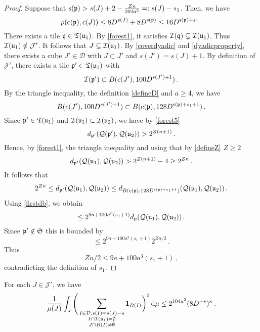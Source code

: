 {    \begin{proof}
        Suppose that $\mathrm{s}(\mathfrak p) > s(J) + 2 -\frac{Zn}{202a^3} =: s(J) - s_1$. Then, we have
        $$
            \rho(\mathrm{c}(\mathfrak p), c(J)) \le 8D^{s(J)}+8D^{\mathrm{s}(\mathfrak p)} \le 16 D^{\mathrm{s}(\mathfrak p) + s_1}\,.
        $$
        There exists a tile $\mathfrak q \in \mathfrak T(\mathfrak u_1)$. By \eqref{forest1}, it satisfies $\mathcal{I}(\mathfrak q) \subsetneq \mathcal{I}(\mathfrak u_1)$. Thus $\mathcal{I}(\mathfrak u_1) \notin \mathcal{J}'$. It follows that $J \subsetneq \mathcal{I}(\mathfrak u_1)$. By \eqref{coverdyadic} and \eqref{dyadicproperty}, there exists a cube $J' \in \mathcal{D}$ with $J \subset J'$ and $s(J') = s(J) + 1$. By definition of $\mathcal{J}'$, there exists a tile $\mathfrak p' \in \mathfrak T(\mathfrak u_1)$ with
        $$
            \mathcal{I}(\mathfrak p') \subset B(c(J'), 100 D^{s(J') + 1})\,.
        $$
        By the triangle inequality, the definition \eqref{defineD} and $a \ge 4$, we have
        $$
            B(c(J'), 100 D^{s(J')+1}) \subset B(\mathrm{c}(\mathfrak p), 128 D^{\mathrm{s}(\mathfrak p) + s_1 + 1})\,.
        $$
        Since $\mathfrak p' \in \mathfrak T(\mathfrak u_1)$ and $\mathcal{I}(\mathfrak u_1) \subset \mathcal{I}(\mathfrak u_2)$, we have by \eqref{forest5}
        $$
            d_{\mathfrak p'}(\mathcal{Q}(\mathfrak p'), \mathcal{Q}(\mathfrak u_2)) > 2^{Z(n+1)}\,.
        $$
        Hence, by \eqref{forest1}, the triangle inequality and using that by \eqref{defineZ} $Z \ge 2$
        $$
            d_{\mathfrak p'}(\mathcal{Q}(\mathfrak u_1), \mathcal{Q}(\mathfrak u_2)) > 2^{Z(n+1)} - 4 \ge 2^{Zn}\,.
        $$
        It follows that
        $$
            2^{Zn} \le d_{\mathfrak p'}(\mathcal{Q}(\mathfrak u_1), \mathcal{Q}(\mathfrak u_2)) \le d_{B(\mathrm{c}(\mathfrak p), 128 D^{\mathrm{s}(\mathfrak p) + s_1+ 1})}(\mathcal{Q}(\mathfrak u_1), \mathcal{Q}(\mathfrak u_2))\,.
        $$
        Using \eqref{firstdb}, we obtain
        $$
            \le 2^{9a + 100a^3 (s_1+1)} d_{\mathfrak p}(\mathcal{Q}(\mathfrak u_1), \mathcal{Q}(\mathfrak u_2))\,.
        $$
        Since $\mathfrak p' \notin \mathfrak{S}$ this is bounded by
        $$
            \le 2^{9a + 100a^3 (s_1+1)} 2^{Zn/2}\,.
        $$
        Thus
        $$
            Z n/2 \le 9a + 100a^3(s_1 + 1)\,,
        $$
        contradicting the definition of $s_1$.
    \end{proof}

    \begin{lemma}
        \label{lem sep tree small aux}
        For each $J \in \mathcal{J}'$, we have
        $$
            \frac{1}{\mu(J)} \int_J \Bigg(\sum_{\substack{I \in \mathcal{D}, s(I) = s(J) - s\\ I \cap \mathcal{I}(\mathfrak u_1) = \emptyset\\
        J \cap B(I) \ne \emptyset}} \mathbf{1}_{B(I)}\bigg)^2 \, \mathrm{d}\mu \le 2^{104a^2} (8 D^{-s})^\kappa\,.
        $$
    \end{lemma}

}
